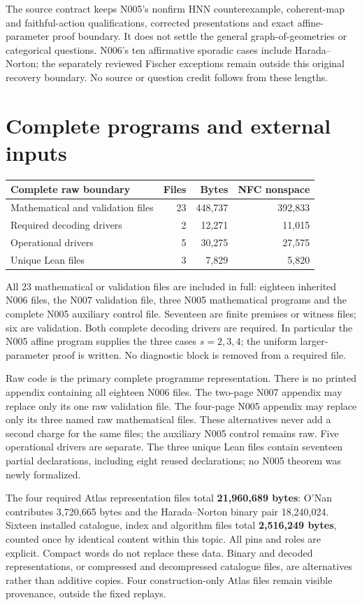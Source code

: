 \documentclass[11pt,a4paper]{article}
\begin{document}
The source contract keeps N005's nonfirm HNN counterexample, coherent-map and faithful-action qualifications, corrected presentations and exact affine-parameter proof boundary. It does not settle the general graph-of-geometries or categorical questions. N006's ten affirmative sporadic cases include Harada--Norton; the separately reviewed Fischer exceptions remain outside this original recovery boundary. No source or question credit follows from these lengths.
\newpage
\section*{Complete programs and external inputs}
\begin{center}\begin{tabular}{lrrr}\toprule
Complete raw boundary & Files & Bytes & NFC nonspace\\\midrule
Mathematical and validation files & 23 & 448,737 & 392,833\\
Required decoding drivers & 2 & 12,271 & 11,015\\
Operational drivers & 5 & 30,275 & 27,575\\
Unique Lean files & 3 & 7,829 & 5,820\\
\bottomrule\end{tabular}\end{center}
All 23 mathematical or validation files are included in full: eighteen inherited N006 files, the N007 validation file, three N005 mathematical programs and the complete N005 auxiliary control file. Seventeen are finite premises or witness files; six are validation. Both complete decoding drivers are required. In particular the N005 affine program supplies the three cases $s=2,3,4$; the uniform larger-parameter proof is written. No diagnostic block is removed from a required file.

Raw code is the primary complete programme representation. There is no printed appendix containing all eighteen N006 files. The two-page N007 appendix may replace only its one raw validation file. The four-page N005 appendix may replace only its three named raw mathematical files. These alternatives never add a second charge for the same files; the auxiliary N005 control remains raw. Five operational drivers are separate. The three unique Lean files contain seventeen partial declarations, including eight reused declarations; no N005 theorem was newly formalized.

The four required Atlas representation files total \textbf{21,960,689 bytes}: O'Nan contributes 3,720,665 bytes and the Harada--Norton binary pair 18,240,024. Sixteen installed catalogue, index and algorithm files total \textbf{2,516,249 bytes}, counted once by identical content within this topic. All pins and roles are explicit. Compact words do not replace these data. Binary and decoded representations, or compressed and decompressed catalogue files, are alternatives rather than additive copies. Four construction-only Atlas files remain visible provenance, outside the fixed replays.
\end{document}
